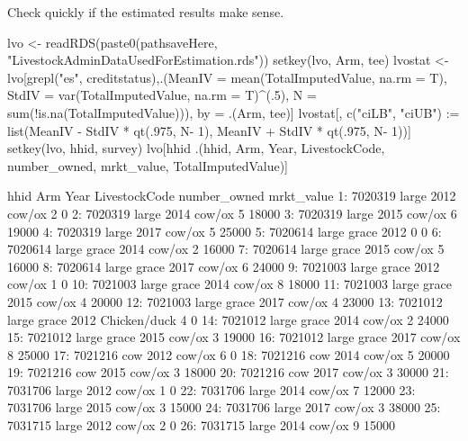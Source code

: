 Check quickly if the estimated results make sense.
\begin{Schunk}
\begin{Sinput}
lvo <-  readRDS(paste0(pathsaveHere, "LivestockAdminDataUsedForEstimation.rds"))
setkey(lvo, Arm, tee)
lvostat <- lvo[grepl("es", creditstatus),.(MeanIV = mean(TotalImputedValue, na.rm = T), 
  StdIV = var(TotalImputedValue, na.rm = T)^(.5), 
  N = sum(!is.na(TotalImputedValue))), by = .(Arm, tee)]
lvostat[, c("ciLB", "ciUB") := list(MeanIV - StdIV * qt(.975, N- 1), MeanIV + StdIV * qt(.975, N- 1))]
setkey(lvo, hhid, survey)
lvo[hhid %in% hhid[TotalImputedValue > 100000],
  .(hhid, Arm, Year, LivestockCode, number_owned, 
  mrkt_value, TotalImputedValue)]
\end{Sinput}
\begin{Soutput}
       hhid         Arm Year LivestockCode number_owned mrkt_value
 1: 7020319       large 2012        cow/ox            2          0
 2: 7020319       large 2014        cow/ox            5      18000
 3: 7020319       large 2015        cow/ox            6      19000
 4: 7020319       large 2017        cow/ox            5      25000
 5: 7020614 large grace 2012                          0          0
 6: 7020614 large grace 2014        cow/ox            2      16000
 7: 7020614 large grace 2015        cow/ox            5      16000
 8: 7020614 large grace 2017        cow/ox            6      24000
 9: 7021003 large grace 2012        cow/ox            1          0
10: 7021003 large grace 2014        cow/ox            8      18000
11: 7021003 large grace 2015        cow/ox            4      20000
12: 7021003 large grace 2017        cow/ox            4      23000
13: 7021012 large grace 2012  Chicken/duck            4          0
14: 7021012 large grace 2014        cow/ox            2      24000
15: 7021012 large grace 2015        cow/ox            3      19000
16: 7021012 large grace 2017        cow/ox            8      25000
17: 7021216         cow 2012        cow/ox            6          0
18: 7021216         cow 2014        cow/ox            5      20000
19: 7021216         cow 2015        cow/ox            3      18000
20: 7021216         cow 2017        cow/ox            3      30000
21: 7031706       large 2012        cow/ox            1          0
22: 7031706       large 2014        cow/ox            7      12000
23: 7031706       large 2015        cow/ox            3      15000
24: 7031706       large 2017        cow/ox            3      38000
25: 7031715       large 2012        cow/ox            2          0
26: 7031715       large 2014        cow/ox            9      15000

\end{Soutput}
\end{Schunk}
